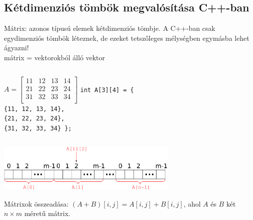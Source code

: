 \documentclass[usenames,dvipsnames,aspectratio=169]{beamer}
\begin{document}
\subsection{Kétdimenziós tömbök megvalósítása C++-ban}
\begin{frame}
  Mátrix: azonos típusú elemek kétdimenziós tömbje. A C++-ban csak egydimenziós tömbök léteznek, de ezeket tetszőleges mélységben egymásba lehet ágyazni! \\ 
  mátrix = vektorokból álló vektor\\
  \begin{columns}[T]
      \hspace{.25cm} $A = \left[ \begin{array}{cccc}
                     11 & 12 & 13 & 14 \\
                     21 & 22 & 23 & 24 \\
                     31 & 32 & 33 & 34 \\
                   \end{array}
                \right]$
      \texttt{int A[3][4] = \{ \\
      \qquad \{11, 12, 13, 14\},\\
      \qquad \{21, 22, 23, 24\},\\
      \qquad \{31, 32, 33, 34\} \};}
  \end{columns}
  \begin{center}
    \includegraphics[width=0.65\textwidth]{matrix.pdf}
  \end{center}
  Mátrixok összeadása: $(A+B)[i,j] = A[i,j] + B[i,j]$, ahol $A$ és $B$ két $n\times m$ méretű mátrix.\\
\end{frame}

\begin{frame}
  \begin{exampleblock}{}
    \scriptsize
    \vspace{-.2cm}
    
    \vspace{-.2cm}
  \end{exampleblock}
\end{frame}
\end{document}
